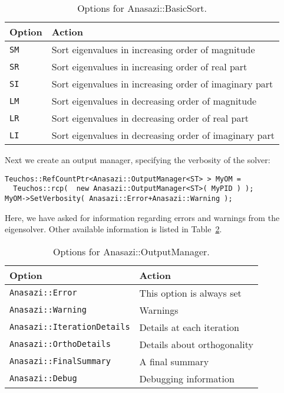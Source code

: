 \begin{table}
\begin{center}
\begin{tabular}{| p{2cm} l |}
\hline
Option & Action \\
\hline
{\tt SM} & Sort eigenvalues in increasing order of magnitude \\
{\tt SR} & Sort eigenvalues in increasing order of real part \\
{\tt SI} & Sort eigenvalues in increasing order of imaginary part \\
{\tt LM} & Sort eigenvalues in decreasing order of magnitude \\
{\tt LR} & Sort eigenvalues in decreasing order of real part \\
{\tt LI} & Sort eigenvalues in decreasing order of imaginary part \\
\hline
\end{tabular}
\caption{Options for Anasazi::BasicSort.}
\label{tab:anasazi:sm}
\end{center}
\end{table}

Next we create an output manager, specifying the verbosity of the
solver:
\begin{verbatim}
Teuchos::RefCountPtr<Anasazi::OutputManager<ST> > MyOM = 
  Teuchos::rcp(  new Anasazi::OutputManager<ST>( MyPID ) );
MyOM->SetVerbosity( Anasazi::Error+Anasazi::Warning );
\end{verbatim}
Here, we have asked for information regarding errors and warnings from
the eigensolver. Other available information is listed in
Table~\ref{tab:anasazi:om}.

\begin{table}
\begin{center}
\begin{tabular}{| p{7cm} l |}
\hline
Option & Action \\
\hline
{\tt Anasazi::Error} & 
  This option is always set \\
{\tt Anasazi::Warning} & 
  Warnings \\
{\tt Anasazi::IterationDetails} & 
  Details at each iteration \\
{\tt Anasazi::OrthoDetails} & 
  Details about orthogonality \\
{\tt Anasazi::FinalSummary} & 
  A final summary \\
{\tt Anasazi::Debug} & 
  Debugging information \\
\hline
\end{tabular}
\caption{Options for Anasazi::OutputManager.}
\label{tab:anasazi:om}
\end{center}
\end{table}

